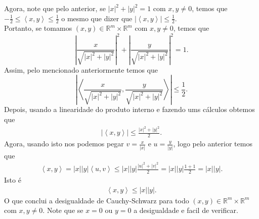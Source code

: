 \begin{homeworkProblem}[Seção 3-5]
\begin{solution}
    Agora, note que pelo anterior, se $|x|^{2}+|y|^{2}=1$ com $x,y\neq 0$, temos que $-\frac{1}{2}\leq \left\langle x,y \right\rangle\leq \frac{1}{2}$ o mesmo que dizer que $\left| \left\langle x,y \right\rangle \right|\leq \frac{1}{2}$.\\
    Portanto, se tomamos $(x,y)\in\mathbb{R}^{m}\times\mathbb{R}^{m}$ com $x,y\neq 0$, temos que 
    $$\left| \frac{x}{\sqrt{|x|^{2}+|y|^{2}}} \right|^{2}+\left| \frac{y}{\sqrt{|x|^{2}+|y|^{2}}} \right|^{2}=1.$$
    Assim, pelo mencionado anteriormente temos que 
    $$\left|\left\langle \frac{x}{\sqrt{|x|^{2}+|y|^{2}}},\frac{y}{\sqrt{|x|^{2}+|y|^{2}}} \right\rangle\right|\leq \frac{1}{2}.$$
    Depois, usando a linearidade do produto interno e fazendo ums cálculos obtemos que
    \begin{align*}
      \left|\left\langle x,y \right\rangle\right|\leq \frac{|x|^{2}+|y|^{2}}{2}.
    \end{align*}
    Agora, usando isto nos podemos pegar $v=\frac{x}{|x|}$ e $u=\frac{y}{|y|}$, logo pelo anterior temos que 
    \begin{align*}
      \left\langle x,y \right\rangle = |x||y|\left\langle u,v \right\rangle\leq |x||y|\frac{|u|^{2}+|v|^{2}}{2}= |x||y|\frac{1+1}{2}= |x||y|.
    \end{align*}
    Isto é
    \begin{align*}
      \left\langle x,y \right\rangle\leq |x||y|.
    \end{align*}
    O que conclui a desigualdade de Cauchy-Schwarz para todo $(x,y)\in\mathbb{R}^{m}\times\mathbb{R}^{m}$ com $x,y\neq 0$. Note que se $x=0$ ou $y=0$ a desigualdade e facil de verificar. 
  \end{solution}
\end{homeworkProblem}
